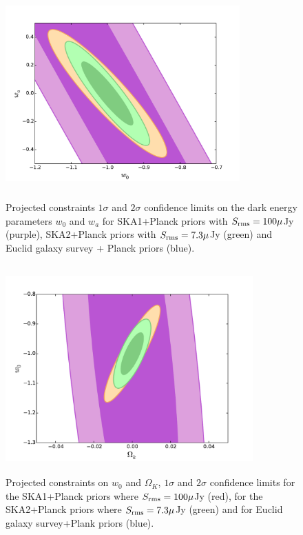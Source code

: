 \documentclass[useAMS,usenatbib]{mn2e}
\begin{document}
\begin{figure}
\begin{center}
\includegraphics[height=8.0cm,width=9.0cm]{plots/output_ellipse_w0_wa.pdf} 
\caption{Projected constraints $1 \sigma$ and $2\sigma$ confidence limits on the dark energy parameters $w_0$ and $w_a$ for  SKA1+Planck priors with $S_{\rm rms} = 100 \mu $Jy (purple), SKA2+Planck priors with  $S_{\rm rms} = 7.3 \mu $Jy (green) and Euclid galaxy survey + Planck priors (blue).}
\label{Fig:w_wa}
\end{center}
\end{figure}




\begin{figure}
\begin{center}
\includegraphics[height=8.0cm,width=9.5cm]{plots/output_ellipse_w0_OK.pdf} 
\caption{Projected constraints on  $w_0$ and $\Omega_K$, $1 \sigma$ and $2\sigma$ confidence limits  for the SKA1+Planck priors where  $S_{\rm rms} = 100 \mu $Jy (red), for the SKA2+Planck priors where  $S_{\rm rms} = 7.3 \mu $Jy (green) and  for Euclid galaxy survey+Plank priors (blue).}
\label{Fig:w_ok}
\end{center}
\end{figure}
\end{document}
